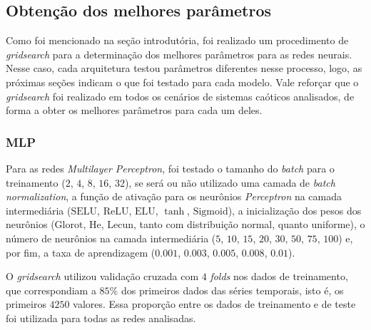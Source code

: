 \documentclass{article}
\newcommand{\sigmoid}{\text{Sigmoid}}
\newcommand{\selu}{\text{SELU}}
\newcommand{\relu}{\text{ReLU}}
\newcommand{\elu}{\text{ELU}}
\newcommand{\lecun}{\text{Lecun}}
\newcommand{\he}{\text{He}}
\newcommand{\glorot}{\text{Glorot}}
\begin{document}
\subsection{Obtenção dos melhores parâmetros}


Como foi mencionado na seção introdutória, foi realizado um procedimento de \textit{gridsearch} para a determinação dos melhores parâmetros para as redes neurais. Nesse caso, cada arquitetura testou parâmetros diferentes nesse processo, logo, as próximas seções indicam o que foi testado para cada modelo. Vale reforçar que o \textit{gridsearch} foi realizado em todos os cenários de sistemas caóticos analisados, de forma a obter os melhores parâmetros para cada um deles.

\subsubsection{MLP}

Para as redes \textit{Multilayer Perceptron}, foi testado o tamanho do \textit{batch} para o treinamento ($2$, $4$, $8$, $16$, $32$), se será ou não utilizado uma camada de \textit{batch normalization}, a função de ativação para os neurônios \textit{Perceptron} na camada intermediária ($\selu$, $\relu$, $\elu$, $\tanh$, $\sigmoid$), a inicialização dos pesos dos neurônios ($\glorot$, $\he$, $\lecun$, tanto com distribuição normal, quanto uniforme), o número de neurônios na camada intermediária ($5$, $10$, $15$, $20$, $30$, $50$, $75$, $100$) e, por fim, a taxa de aprendizagem ($0.001$, $0.003$, $0.005$, $0.008$, $0.01$). 

O \textit{gridsearch} utilizou validação cruzada com $4$ \textit{folds} nos dados de treinamento, que correspondiam a $85\%$ dos primeiros dados das séries temporais, isto é, os primeiros $4250$ valores. Essa proporção entre os dados de treinamento e de teste foi utilizada para todas as redes analisadas.
\end{document}
